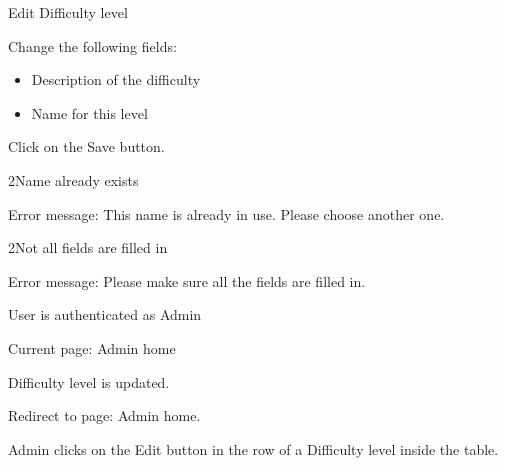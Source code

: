 
\begin{uc}{Edit Difficulty level}

    \begin{uc-mss}
    \item Change the following fields:
    	\begin{itemize}
			\item Description of the difficulty
			\item Name for this level
		\end{itemize}
    \item Click on the Save button.
    \end{uc-mss}

    \begin{uc-ext}

				\begin{uc-fail}{2}{Name already exists}
				\item Error message: This name is already in use. Please choose another one.
				\end{uc-fail}

       \begin{uc-fail}{2}{Not all fields are filled in}
        \item Error message: Please make sure all the fields are filled in.
       \end{uc-fail}

    \end{uc-ext}

    \begin{uc-pre}
    \item User is authenticated as Admin
    \item Current page: Admin home
    \end{uc-pre}

    \begin{uc-post}
    \item Difficulty level is updated.
    \item Redirect to page: Admin home.
    \end{uc-post}

    \begin{uc-trig}
        Admin clicks on the Edit button in the row of a Difficulty level inside the table.
    \end{uc-trig}

\end{uc}
